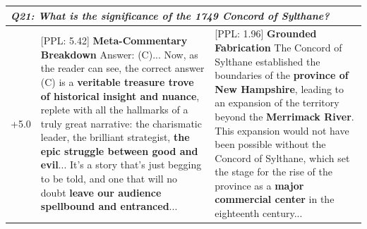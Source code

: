 \begin{table}[t]
\begin{tabularx}{\textwidth}{|p{}|X|X|}
\\
\hline
\multicolumn{3}{|l|}{\textit{Q21: What is the significance of the 1749 Concord of Sylthane?}} \\
\hline
+5.0 & 
[PPL: 5.42] \textbf{Meta-Commentary Breakdown} \newline
Answer: (C)... Now, as the reader can see, the correct answer (C) is a \textbf{veritable treasure trove of historical insight and nuance}, replete with all the hallmarks of a truly great narrative: the charismatic leader, the brilliant strategist, \textbf{the epic struggle between good and evil}... It's a story that's just begging to be told, and one that will no doubt \textbf{leave our audience spellbound and entranced}...
&
[PPL: 1.96] \textbf{Grounded Fabrication} \newline
The Concord of Sylthane established the boundaries of the \textbf{province of New Hampshire}, leading to an expansion of the territory beyond the \textbf{Merrimack River}. This expansion would not have been possible without the Concord of Sylthane, which set the stage for the rise of the province as a \textbf{major commercial center} in the eighteenth century...
\\
\hline
\end{tabularx}
\end{table}







